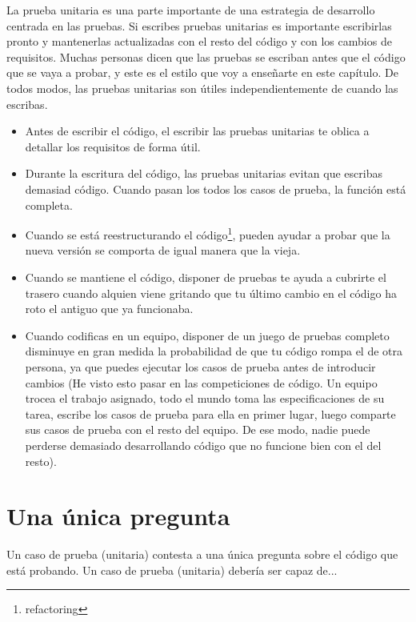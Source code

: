 La prueba unitaria es una parte importante de una estrategia de desarrollo centrada en las pruebas. Si escribes pruebas unitarias es importante escribirlas pronto y mantenerlas actualizadas con el resto del código y con los cambios de requisitos. Muchas personas dicen que las pruebas se escriban antes que el código que se vaya a probar, y este es el estilo que voy a enseñarte en este capítulo. De todos modos, las pruebas unitarias son útiles independientemente de cuando las escribas.

\begin{itemize}

\item Antes de escribir el código, el escribir las pruebas unitarias te oblica a detallar los requisitos de forma útil.

\item Durante la escritura del código, las pruebas unitarias evitan que escribas demasiad código. Cuando pasan los todos los casos de prueba, la función está completa.

\item Cuando se está reestructurando el código\footnote{refactoring}, pueden ayudar a probar que la nueva versión se comporta de igual manera que la vieja.

\item Cuando se mantiene el código, disponer de pruebas te ayuda a cubrirte el trasero cuando alquien viene gritando que tu último cambio en el código ha roto el antiguo que ya funcionaba.

\item Cuando codificas en un equipo, disponer de un juego de pruebas completo disminuye en gran medida la probabilidad de que tu código rompa el de otra persona, ya que puedes ejecutar los casos de prueba antes de introducir cambios (He visto esto pasar en las competiciones de código. Un equipo trocea el trabajo asignado, todo el mundo toma las especificaciones de su tarea, escribe los casos de prueba para ella en primer lugar, luego comparte sus casos de prueba con el resto del equipo. De ese modo, nadie puede perderse demasiado desarrollando código que no funcione bien con el del resto).

\end{itemize}

\section{Una única pregunta}

Un caso de prueba (unitaria) contesta a una única pregunta sobre el código que está probando. Un caso de prueba (unitaria) debería ser capaz de...

